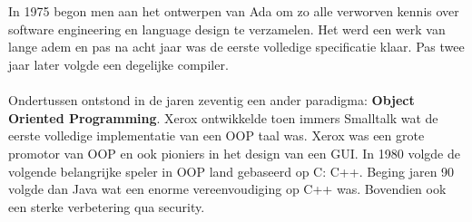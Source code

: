 \documentclass[../main.tex]{subfiles}
\begin{document}
\begin{solution}
\\\\
In 1975 begon men aan het ontwerpen van Ada om zo alle verworven kennis over software engineering en language design te verzamelen.
Het werd een werk van lange adem en pas na acht jaar was de eerste volledige specificatie klaar.
Pas twee jaar later volgde een degelijke compiler.
\\\\
Ondertussen ontstond in de jaren zeventig een ander paradigma: \textbf{Object Oriented Programming}.
Xerox ontwikkelde toen immers Smalltalk wat de eerste volledige implementatie van een OOP taal was.
Xerox was een grote promotor van OOP en ook pioniers in het design van een GUI.
In 1980 volgde de volgende belangrijke speler in OOP land gebaseerd op C: C++.
Beging jaren 90 volgde dan Java wat een enorme vereenvoudiging op C++ was.
Bovendien ook een sterke verbetering qua security.
\end{solution}
\end{document}
